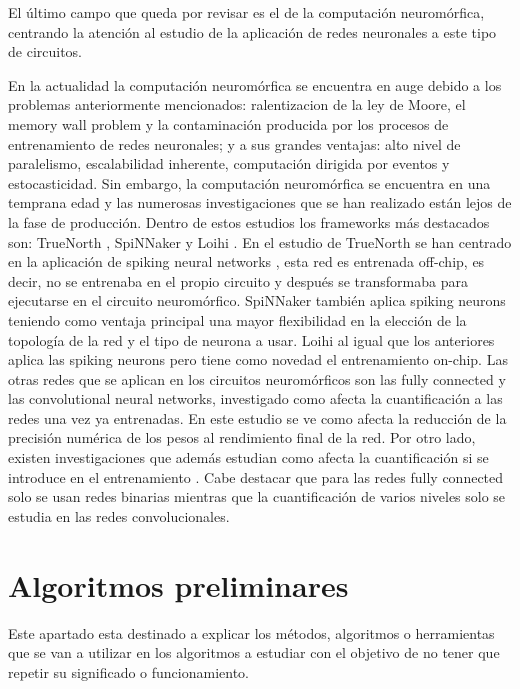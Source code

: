 El último campo que queda por revisar es el de la computación neuromórfica, centrando la atención al estudio de la aplicación de redes neuronales a este tipo de circuitos. 

En la actualidad la computación neuromórfica se encuentra en auge debido a los problemas anteriormente mencionados: ralentizacion de la ley de Moore, el memory wall problem y la contaminación producida por los procesos de entrenamiento de redes neuronales; y a sus  grandes ventajas: alto nivel de paralelismo, escalabilidad inherente, computación dirigida por eventos y estocasticidad. Sin embargo, la computación neuromórfica se encuentra en una temprana edad y las numerosas investigaciones que se han realizado están lejos de la fase de producción. Dentro de estos estudios los frameworks más destacados son: TrueNorth \cite{7229264}, SpiNNaker \cite{6750072} y Loihi \cite{8259423}. En el estudio de TrueNorth se han centrado en la aplicación de spiking neural networks \cite{doi:10.1142/S0129065709002002}, esta red es entrenada off-chip, es decir, no se entrenaba en el propio circuito y después se transformaba para ejecutarse en el circuito neuromórfico. SpiNNaker también aplica spiking neurons teniendo como ventaja principal una mayor flexibilidad en la elección de la topología de la red y el tipo de neurona a usar. Loihi al igual que los anteriores aplica las spiking neurons pero tiene como novedad el entrenamiento on-chip. Las otras redes que se aplican en los circuitos neuromórficos son las fully connected y las convolutional neural networks, investigado como afecta la cuantificación a las redes una vez ya entrenadas. En este estudio \cite{10481/72221} se ve como afecta la reducción de la precisión numérica de los pesos al rendimiento final de la red. Por otro lado, existen investigaciones que además estudian como afecta la cuantificación si se introduce en el entrenamiento \cite{8705375}. Cabe destacar que para las redes fully connected solo se usan redes binarias mientras que la cuantificación de varios niveles solo se estudia en las redes convolucionales. \cite{DBLP:journals/corr/SchumanPPBDRP17}

\section{Algoritmos preliminares}

Este apartado esta destinado a explicar los métodos, algoritmos o herramientas que se van a utilizar en los algoritmos a estudiar con el objetivo de no tener que repetir su significado o funcionamiento.

